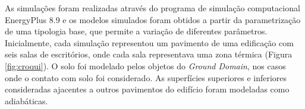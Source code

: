 \documentclass[brazil,hardcopy,openany,a5paper]{ufscthesis}
\begin{document}
%		

		As simulações foram realizadas através do programa de simulação computacional EnergyPlus 8.9 \cite{EnergyPlus2018} e os modelos simulados foram obtidos a partir da parametrização de uma tipologia base, que permite a variação de diferentes parâmetros.  %
		Inicialmente, cada simulação representou um pavimento de uma edificação com seis salas de escritórios, onde cada sala representava uma zona térmica (Figura \ref{fig:croqui}).
		O solo foi modelado pelos objetos do \textit{Ground Domain}, nos casos onde o contato com solo foi considerado. As superfícies superiores e inferiores consideradas ajacentes a outros pavimentos do edifício foram modeladas como adiabáticas.
		
\end{document}
